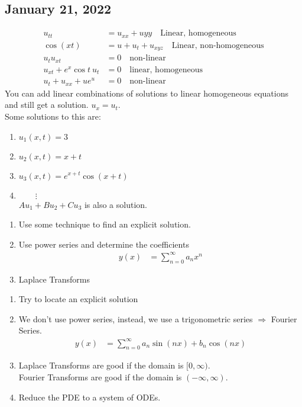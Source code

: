 \subsection*{January 21, 2022}
\Ex
\begin{align}
  u_{tt} & = u_{xx} + u{yy}\quad \text{Linear, homogeneous}\\
  \cos{(xt)} & = u + u_t + u_{xyz}\quad \text{Linear, non-homogeneous}\\
  u_tu_{xt} & = 0\quad \text{non-linear}\\
  u_{xt} + e^x \cos t\ u_t & = 0\quad \text{linear, homogeneous}\\
  u_t + u_{xx} + ue^u & = 0\quad \text{non-linear}
\end{align}
\note You can add linear combinations of solutions to linear homogeneous equations and still get a solution.
\Ex $u_x = u_t$.\\
Some solutions to this are:
\begin{enumerate}
  \item $u_1(x, t) = 3$
  \item $u_2(x, t) = x + t$
  \item $u_3(x, t) = e^{x+t} \cos(x + t)$
  \item $\qquad \vdots$\\
  $Au_1 + Bu_2 + Cu_3$ is also a solution.
\end{enumerate}
\begin{enumerate}
  \item Use some technique to find an explicit solution.
  \item Use power series and determine the coefficients
  \begin{align}
    y(x) & = \sum^\infty_{n = 0} a_nx^n
  \end{align}
  \item Laplace Transforms
\end{enumerate}
\begin{enumerate}
  \item Try to locate an explicit solution
  \item We don't use power series, instead, we use a trigonometric series $\Rightarrow$ Fourier Series.
  \begin{align}
    y(x) & = \sum^\infty_{n = 0} a_n \sin(nx) + b_n \cos(nx)
  \end{align}
  \item Laplace Transforms are good if the domain is $[0, \infty)$.\\
  Fourier Transforms are good if the domain is $(-\infty, \infty)$.
  \item Reduce the PDE to a system of ODEs.
\end{enumerate}
